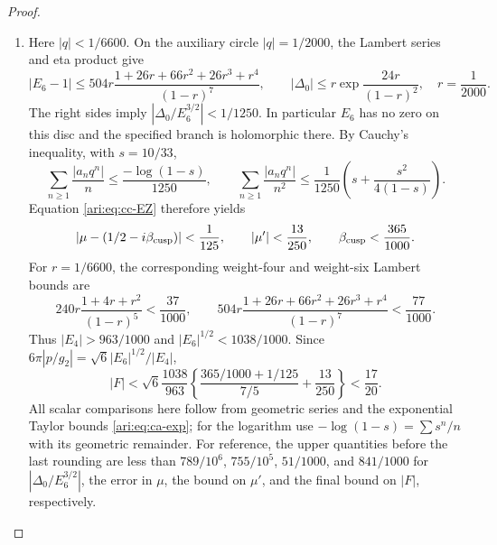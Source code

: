 \begin{proof}
\begin{enumerate}[label=\arabic*.,leftmargin=*]
\item Here $|q|<1/6600$. On the auxiliary circle $|q|=1/2000$,
the Lambert series and eta product give
\[
 |E_6-1|\le
 504r\frac{1+26r+66r^2+26r^3+r^4}{(1-r)^7},\qquad
 |\Delta_0|\le r\exp\!\frac{24r}{(1-r)^2},
 \quad r=\frac1{2000}.
\]
The right sides imply $|\Delta_0/E_6^{3/2}|<1/1250$.
In particular $E_6$ has no zero on this disc and the specified
branch is holomorphic there. By Cauchy's inequality, with
$s=10/33$,
\[
 \sum_{n\ge1}\frac{|a_nq^n|}{n}
 \le\frac{-\log(1-s)}{1250},\qquad
 \sum_{n\ge1}\frac{|a_nq^n|}{n^2}
 \le\frac1{1250}\left(s+\frac{s^2}{4(1-s)}\right).
\]
Equation \eqref{ari:eq:cc-EZ} therefore yields
\[
 |\mu-(1/2-i\beta_{\rm cusp})|<\frac1{125},\qquad
 |\mu'|<\frac{13}{250},\qquad \beta_{\rm cusp}<\frac{365}{1000}.
\]
For $r=1/6600$, the corresponding weight-four and weight-six
Lambert bounds are
\[
 240r\frac{1+4r+r^2}{(1-r)^5}<\frac{37}{1000},\qquad
 504r\frac{1+26r+66r^2+26r^3+r^4}{(1-r)^7}
       <\frac{77}{1000}.
\]
Thus $|E_4|>963/1000$ and $|E_6|^{1/2}<1038/1000$.
Since $6\pi|p/g_2|=\sqrt6|E_6|^{1/2}/|E_4|$,
\begin{equation}\label{ari:eq:cc-cuspbound}
 |F|<\sqrt6\frac{1038}{963}
 \left\{\frac{365/1000+1/125}{7/5}+\frac{13}{250}\right\}
 <\frac{17}{20}.
\end{equation}
All scalar comparisons here follow from geometric series and
the exponential Taylor bounds \eqref{ari:eq:ca-exp}; for the logarithm
use $-\log(1-s)=\sum s^n/n$ with its geometric remainder.
For reference, the upper quantities before the last rounding are
less than $789/10^6$, $755/10^5$, $51/1000$, and $841/1000$
for $|\Delta_0/E_6^{3/2}|$, the error in $\mu$, the bound on
$\mu'$, and the final bound on $|F|$, respectively.
\end{enumerate}
\end{proof}


